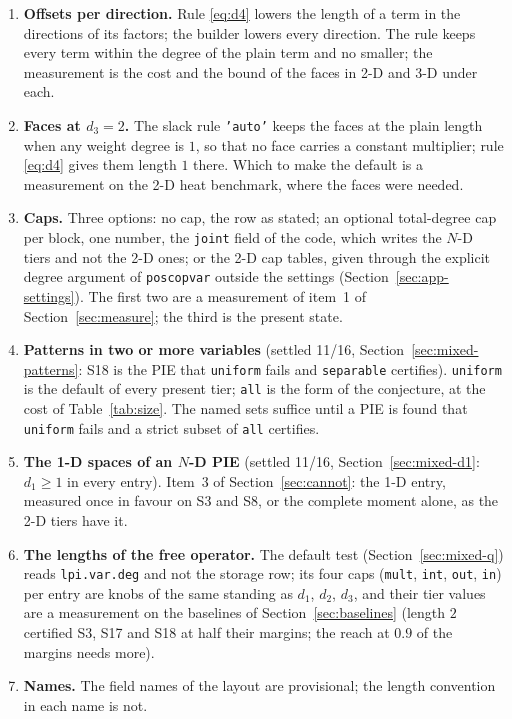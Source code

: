 \documentclass[12pt]{article}
\newcommand{\code}[1]{\texttt{#1}}
\theoremstyle{plain}
\theoremstyle{definition}
\theoremstyle{remark}
\begin{document}
\begin{enumerate}\setlength\itemsep{0pt}
\item \textbf{Offsets per direction.} Rule \eqref{eq:d4} lowers the length of a term in the directions of its factors; the builder lowers every direction. The rule keeps every term within the degree of the plain term and no smaller; the measurement is the cost and the bound of the faces in 2-D and 3-D under each.
\item \textbf{Faces at $d_3=2$.} The slack rule \code{'auto'} keeps the faces at the plain length when any weight degree is $1$, so that no face carries a constant multiplier; rule \eqref{eq:d4} gives them length $1$ there. Which to make the default is a measurement on the 2-D heat benchmark, where the faces were needed.
\item \textbf{Caps.} Three options: no cap, the row as stated; an optional total-degree cap per block, one number, the \code{joint} field of the code, which writes the $N$-D tiers and not the 2-D ones; or the 2-D cap tables, given through the explicit degree argument of \code{poscopvar} outside the settings (Section~\ref{sec:app-settings}). The first two are a measurement of item~1 of Section~\ref{sec:measure}; the third is the present state.
\item \textbf{Patterns in two or more variables} (settled 11/16, Section~\ref{sec:mixed-patterns}: S18 is the PIE that \code{uniform} fails and \code{separable} certifies). \code{uniform} is the default of every present tier; \code{all} is the form of the conjecture, at the cost of Table~\ref{tab:size}. The named sets suffice until a PIE is found that \code{uniform} fails and a strict subset of \code{all} certifies.
\item \textbf{The 1-D spaces of an $N$-D PIE} (settled 11/16, Section~\ref{sec:mixed-d1}: $d_1\ge1$ in every entry). Item~3 of Section~\ref{sec:cannot}: the 1-D entry, measured once in favour on S3 and S8, or the complete moment alone, as the 2-D tiers have it.
\item \textbf{The lengths of the free operator.} The default test (Section~\ref{sec:mixed-q}) reads \code{lpi.var.deg} and not the storage row; its four caps (\code{mult}, \code{int}, \code{out}, \code{in}) per entry are knobs of the same standing as $d_1$, $d_2$, $d_3$, and their tier values are a measurement on the baselines of Section~\ref{sec:baselines} (length $2$ certified S3, S17 and S18 at half their margins; the reach at $0.9$ of the margins needs more).
\item \textbf{Names.} The field names of the layout are provisional; the length convention in each name is not.

\end{enumerate}
\end{document}
